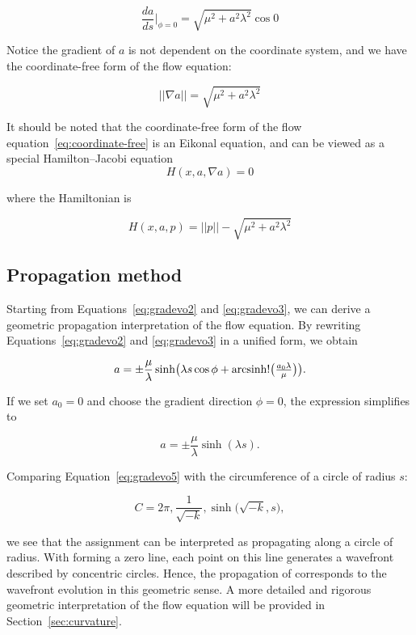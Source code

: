 \[
    \frac{da}{ds}|_{\phi = 0} = \sqrt{\mu^2 + a^2 \lambda^2} \cos 0
\]

Notice the gradient of \(a\) is not dependent on the coordinate system, and we have the coordinate-free form of the flow equation:

\begin{equation}\label{eq:coordinate-free}
||\nabla a|| = \sqrt{\mu^2 + a^2 \lambda^2}
\end{equation}

It should be noted that the coordinate-free form of the flow equation~\eqref{eq:coordinate-free} is an Eikonal equation,
and can be viewed as a special Hamilton–Jacobi equation
\[
H(x, a, \nabla a) = 0
\]

where the Hamiltonian is

\begin{equation}\label{eq:hamiltonian}
    H(x, a, p) = ||p|| - \sqrt{\mu^2 + a^2 \lambda^2}
\end{equation}

\subsection{Propagation method}\label{subsec:propagation-method}

Starting from Equations~\eqref{eq:gradevo2} and \eqref{eq:gradevo3}, we can derive a geometric propagation interpretation of the flow equation.
By rewriting Equations~\eqref{eq:gradevo2} and \eqref{eq:gradevo3} in a unified form, we obtain

\begin{equation}
a = \pm \frac{\mu}{\lambda} \sinh\bigl(\lambda s \cos \phi + \operatorname{arcsinh}!\bigl(\tfrac{a_0 \lambda}{\mu}\bigr)\bigr).\label{eq:gradevo4}
\end{equation}

If we set $a_0=0$ and choose the gradient direction $\phi=0$, the expression simplifies to

\begin{equation}
a = \pm \frac{\mu}{\lambda} \sinh(\lambda s).\label{eq:gradevo5}
\end{equation}

Comparing Equation~\eqref{eq:gradevo5} with the circumference of a circle of radius $s$:

\begin{equation}
C = 2\pi ,\frac{1}{\sqrt{-k}} ,\sinh\bigl(\sqrt{-k},s\bigr), \label{eq:circle}
\end{equation}

we see that the assignment  can be interpreted as propagating along a circle of radius.
With  forming a zero line, each point on this line generates a wavefront described by concentric circles.
Hence, the propagation of  corresponds to the wavefront evolution in this geometric sense.
A more detailed and rigorous geometric interpretation of the flow equation will be provided in Section~\ref{sec:curvature}.

